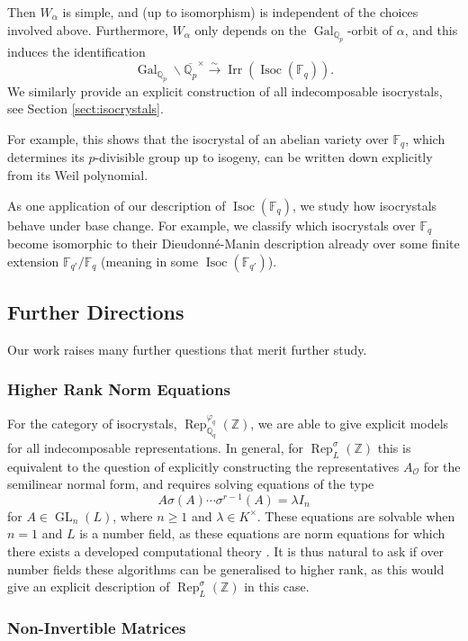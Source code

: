 \documentclass[10pt, reqno, hidelinks]{amsart}
\newcommand{\OO}{\mathcal{O}}
\DeclareMathOperator{\Isoc}{Isoc}
\DeclareMathOperator{\Gal}{Gal}
\DeclareMathOperator{\Rep}{Rep}
\DeclareMathOperator{\Irr}{Irr}
\DeclareMathOperator{\GL}{GL}
\newcommand{\bF}{{\mathbb F}}
\newcommand{\bQ}{{\mathbb Q}}
\newcommand{\bZ}{{\mathbb Z}}
\numberwithin{thm}{subsection}
\theoremstyle{definition}
\begin{document}
Then $W_{\alpha}$ is simple, and (up to isomorphism) is independent of the choices involved above. Furthermore, $W_{\alpha}$ only depends on the $\Gal_{\bQ_p}$-orbit of $\alpha$, and this induces the identification
\[
\Gal_{\bQ_p} \!\! \backslash \overline{\bQ_p}^{\times} \xrightarrow{\sim} \Irr(\Isoc(\bF_q)).
\]
We similarly provide an explicit construction of all indecomposable isocrystals, see Section \ref{sect:isocrystals}.

For example, this shows that the isocrystal of an abelian variety over $\bF_q$, which determines its $p$-divisible group up to isogeny, can be written down explicitly from its Weil polynomial.

As one application of our description of $\Isoc(\bF_q)$, we study how isocrystals behave under base change. For example, we classify which isocrystals over $\bF_q$ become isomorphic to their Dieudonn\'{e}-Manin description already over some finite extension $\bF_{q'} / \bF_q$ (meaning in some $\Isoc(\bF_{q'})$).

\subsection*{Further Directions} Our work raises many further questions that merit further study.

\subsubsection*{Higher Rank Norm Equations}

For the category of isocrystals, $\Rep_{\bQ_q}^{\varphi_q}(\bZ)$, we are able to give explicit models for all indecomposable representations. In general, for $\Rep_{L}^{\sigma}(\bZ)$ this is equivalent to the question of explicitly constructing the representatives $A_{\OO}$ for the semilinear normal form, and requires solving equations of the type
\[
A \sigma(A) \cdots \sigma^{r-1}(A) = \lambda I_n
\]
for $A \in \GL_n(L)$, where $n \geq 1$ and $\lambda \in K^{\times}$. These equations are solvable when $n = 1$ and $L$ is a number field, as these equations are norm equations for which there exists a developed computational theory \cite{Coh, Denis}. It is thus natural to ask if over number fields these algorithms can be generalised to higher rank, as this would give an explicit description of $\Rep_{L}^{\sigma}(\bZ)$ in this case.

\subsubsection*{Non-Invertible Matrices}
\end{document}
